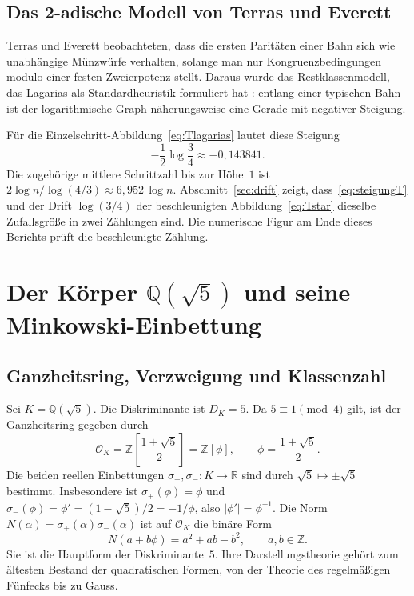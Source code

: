 \documentclass[11pt,a4paper]{article}
\theoremstyle{plain}
\theoremstyle{definition}
\newcommand{\Z}{\mathbb{Z}}
\newcommand{\Q}{\mathbb{Q}}
\newcommand{\R}{\mathbb{R}}
\newcommand{\OK}{\mathcal{O}_K}
\numberwithin{equation}{section}
\begin{document}
\subsection{Das 2-adische Modell von Terras und Everett}

Terras \cite{Terras1976} und Everett \cite{Everett1977} beobachteten, dass die
ersten Paritäten einer Bahn sich wie unabhängige Münzwürfe verhalten, solange
man nur Kongruenzbedingungen modulo einer festen Zweierpotenz stellt.
Daraus wurde das Restklassenmodell, das Lagarias als Standardheuristik
formuliert hat \cite{Lagarias1985,Lagarias2021}: entlang einer typischen Bahn
ist der logarithmische Graph näherungsweise eine Gerade mit negativer Steigung.

Für die Einzelschritt-Abbildung~\eqref{eq:Tlagarias} lautet diese Steigung
\begin{equation}
\label{eq:steigungT}
-\frac12\log\frac34 \approx -0{,}143841.
\end{equation}
Die zugehörige mittlere Schrittzahl bis zur Höhe~$1$ ist
$2\log n\big/\log(4/3)\approx 6{,}952\,\log n$.
Abschnitt~\ref{sec:drift} zeigt, dass~\eqref{eq:steigungT} und der Drift
$\log(3/4)$ der beschleunigten Abbildung~\eqref{eq:Tstar} dieselbe
Zufallsgröße in zwei Zählungen sind.
Die numerische Figur am Ende dieses Berichts prüft die beschleunigte Zählung.

\section{Der Körper \texorpdfstring{$\Q(\sqrt{5})$}{Q(sqrt(5))}
und seine Minkowski-Einbettung}

\subsection{Ganzheitsring, Verzweigung und Klassenzahl}

Sei $K=\Q(\sqrt{5})$.
Die Diskriminante ist $D_K=5$.
Da $5\equiv 1\pmod{4}$ gilt, ist der Ganzheitsring gegeben durch
\begin{equation}
\OK=\Z\!\left[\frac{1+\sqrt{5}}{2}\right]=\Z[\phi],
\qquad
\phi=\frac{1+\sqrt{5}}{2}.
\end{equation}
Die beiden reellen Einbettungen $\sigma_+,\sigma_-:K\to\R$ sind durch
$\sqrt{5}\mapsto\pm\sqrt{5}$ bestimmt.
Insbesondere ist $\sigma_+(\phi)=\phi$ und $\sigma_-(\phi)=\phi'=(1-\sqrt{5})/2=-1/\phi$,
also $\lvert\phi'\rvert=\phi^{-1}$.
Die Norm $N(\alpha)=\sigma_+(\alpha)\sigma_-(\alpha)$ ist auf $\OK$ die binäre Form
\begin{equation}
\label{eq:normform}
N(a+b\phi)=a^2+ab-b^2,\qquad a,b\in\Z.
\end{equation}
Sie ist die Hauptform der Diskriminante~$5$.
Ihre Darstellungstheorie gehört zum ältesten Bestand der quadratischen Formen,
von der Theorie des regelmäßigen Fünfecks bis zu Gauss.
\end{document}
